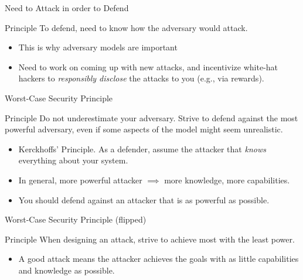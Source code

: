 \documentclass[10pt]{beamer}
\begin{document}
\begin{frame}[fragile]{Need to Attack in order to Defend}
  \begin{alertblock}{Principle}
    To defend, need to know how the adversary would attack.
  \end{alertblock}

  \pause
  \begin{itemize}[<+-| alert@+>]
    \item This is why adversary models are important
    \item Need to work on coming up with new attacks, and incentivize white-hat hackers to
      \emph{responsibly disclose} the attacks to you (e.g., via rewards).
  \end{itemize}
\end{frame}


\begin{frame}[fragile]{Worst-Case Security Principle}
  \begin{alertblock}{Principle}
    Do not underestimate your adversary. Strive to defend against the most powerful adversary, even
    if some aspects of the model might seem unrealistic.
  \end{alertblock}

  \pause
  \begin{itemize}[<+-| alert@+>]
    \item Kerckhoffs' Principle. As a defender, assume the attacker that \emph{knows} everything about your system.
    \item In general, more powerful attacker $\implies$ more knowledge, more capabilities.
    \item You should defend against an attacker that is as powerful as possible.
  \end{itemize}
\end{frame}


\begin{frame}[fragile]{Worst-Case Security Principle (flipped)}
  \begin{alertblock}{Principle}
    When designing an attack, strive to achieve most with the least power.
  \end{alertblock}

  \pause
  \begin{itemize}[<+-| alert@+>]
    \item A good attack means the attacker achieves the goals with as little capabilities and
      knowledge as possible.
  \end{itemize}
\end{frame}
\end{document}
